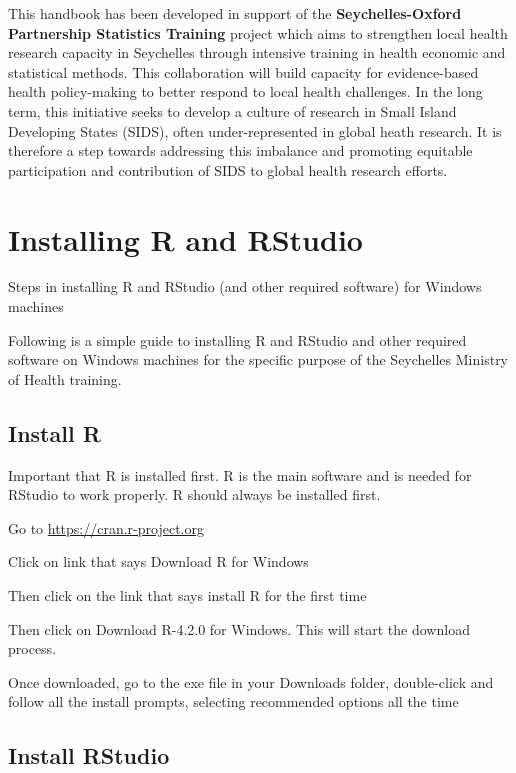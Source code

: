 \documentclass[
  12pt,
]{book}
\begin{document}
This handbook has been developed in support of the \textbf{Seychelles-Oxford Partnership Statistics Training} project which aims to strengthen local health research capacity in Seychelles through intensive training in health economic and statistical methods. This collaboration will build capacity for evidence-based health policy-making to better respond to local health challenges. In the long term, this initiative seeks to develop a culture of research in Small Island Developing States (SIDS), often under-represented in global heath research. It is therefore a step towards addressing this imbalance and promoting equitable participation and contribution of SIDS to global health research efforts.

\hypertarget{install-r}{%
\chapter{Installing R and RStudio}\label{install-r}}

Steps in installing R and RStudio (and other required software) for Windows machines

Following is a simple guide to installing R and RStudio and other required software on Windows machines for the specific purpose of the Seychelles Ministry of Health training.

\hypertarget{install-r-1}{%
\section{Install R}\label{install-r-1}}

Important that R is installed first. R is the main software and is needed for RStudio to work properly. R should always be installed first.

Go to \url{https://cran.r-project.org}

Click on link that says Download R for Windows

Then click on the link that says install R for the first time

Then click on Download R-4.2.0 for Windows. This will start the download process.

Once downloaded, go to the exe file in your Downloads folder, double-click and follow all the install prompts, selecting recommended options all the time

\hypertarget{install-rstudio}{%
\section{Install RStudio}\label{install-rstudio}}
\end{document}
